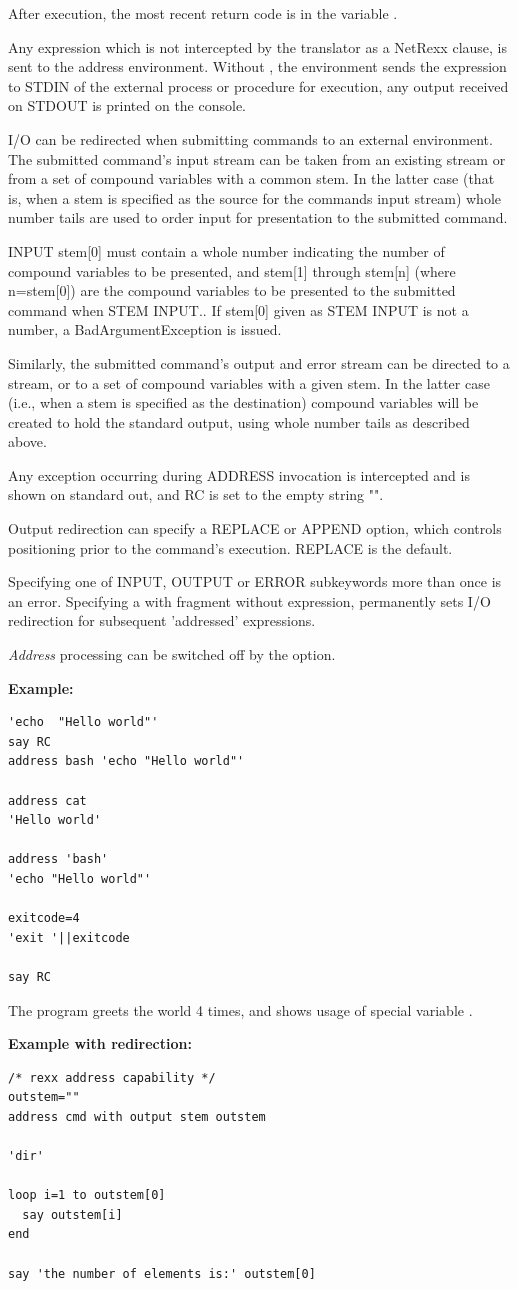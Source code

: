 After execution, the most recent return code is in the variable .

Any expression which is not intercepted by the translator as a NetRexx clause, is sent to the address environment.
Without , the environment sends the expression to STDIN of the external process or procedure for execution, 
any output received on STDOUT is printed on the console.

I/O can be redirected when submitting commands to an external
environment. The submitted command's input stream can be taken from an
existing stream or from a set of compound variables with a common
stem. In the latter case (that is, when a stem is specified as the
source for the commands input stream) whole number tails are used to
order input for presentation to the submitted command.

INPUT stem[0] must contain a whole number indicating the number of compound variables to be presented,
and stem[1] through stem[n] (where n=stem[0]) are the compound variables to be presented to the submitted command when STEM INPUT..
If stem[0] given as STEM INPUT is not a number, a BadArgumentException is issued.

Similarly, the submitted command's output and error stream can be directed to a stream, 
or to a set of compound variables with a given stem. In the latter case (i.e., when a stem is specified as the destination) 
compound variables will be created to hold the standard output, using whole number tails as described above.

Any exception occurring during ADDRESS invocation is intercepted and is shown on standard out, and RC is set to the empty string "".

Output redirection can specify a REPLACE or APPEND option, which controls positioning prior to the command's execution. REPLACE is the default.

Specifying one of INPUT, OUTPUT or ERROR subkeywords more than once is an error.
Specifying a with fragment without expression, permanently sets I/O redirection for subsequent 'addressed' expressions.

\emph{Address} processing can be switched off by the  option.

\textbf{Example:}
\begin{lstlisting}
'echo  "Hello world"'
say RC
address bash 'echo "Hello world"'

address cat
'Hello world'

address 'bash'
'echo "Hello world"'

exitcode=4
'exit '||exitcode
 
say RC
\end{lstlisting}
The program greets the world 4 times, and shows usage of special variable .

\textbf{Example with redirection:}
\begin{lstlisting}
/* rexx address capability */
outstem=""
address cmd with output stem outstem

'dir'

loop i=1 to outstem[0]
  say outstem[i]
end

say 'the number of elements is:' outstem[0]
\end{lstlisting}

